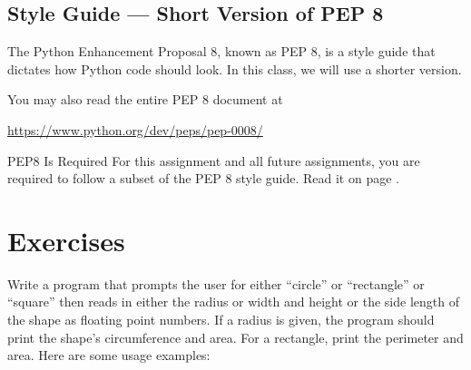 \documentclass[11pt]{cselabheader}
\begin{document}
\subsection{Style Guide --- Short Version of PEP 8}\label{pep8}

The Python Enhancement Proposal 8, known as PEP 8, is a style guide
that dictates how Python code should look. In this class, we will use
a shorter version.



You may also read the entire PEP 8 document at
\begin{center}
 \url{https://www.python.org/dev/peps/pep-0008/}
\end{center}



\newpage

\begin{warningbox}{PEP8 Is Required}
  For this assignment and all future assignments, you are required to
  follow a subset of the PEP 8 style guide.  Read it on page
  \pageref{pep8}.
\end{warningbox}

\section{Exercises}\label{exercises}

\begin{ex}[shapes.py]

  Write a program that prompts the user for either ``circle'' or ``rectangle''
  or ``square'' then reads in either the radius or width and height or the side
  length of the shape as floating point numbers. If a radius is given, the
  program should print the shape's circumference and area. For a rectangle,
  print the perimeter and area.  Here are some usage examples:

\end{ex}
\end{document}
